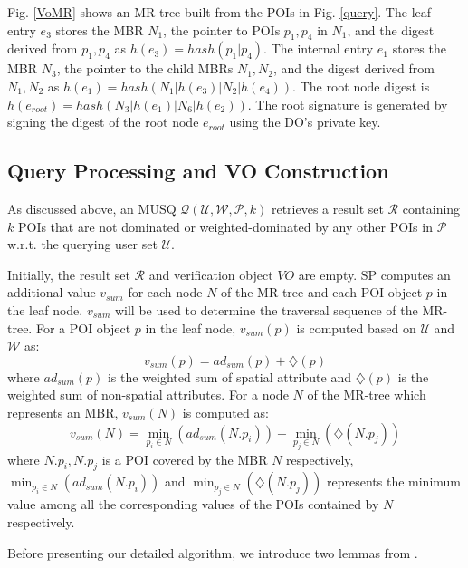 \documentclass[10pt, conference, compsocconf]{IEEEtran}
\begin{document}
Fig. \ref{VoMR} shows an MR-tree built from the POIs in Fig. \ref{query}. The leaf entry $e_3$ stores the MBR $N_1$, the pointer to POIs $p_1, p_4$ in $N_1$, and the digest derived from $p_1, p_4$ as $h(e_3) = hash(p_1|p_4)$. The internal entry $e_1$ stores the MBR $N_3$, the pointer to the child MBRs $N_1, N_2$, and the digest derived from $N_1, N_2$ as $h(e_1) = hash(N_1 | h(e_3) | N_2 | h(e_4))$. The root node digest is $h(e_{root}) = hash(N_3 | h(e_1) | N_6 | h(e_2))$. The root signature is generated by signing the digest of the root node $e_{root}$ using the DO's private key.




\subsection{Query Processing and VO Construction}\label{processing}

As discussed above, an MUSQ $\mathcal{Q}(\mathcal{U}, \mathcal{W}, \mathcal{P}, k)$ retrieves a result set $\mathcal{R}$ containing $k$ POIs that are not dominated or weighted-dominated by any other POIs in $\mathcal{P}$ w.r.t. the querying user set $\mathcal{U}$.

Initially, the result set $\mathcal{R}$ and verification object $VO$ are empty. SP computes an additional value $v_{sum}$ for each node $N$ of the MR-tree and each POI object $p$ in the leaf node. $v_{sum}$ will be used to determine the traversal sequence of the MR-tree. For a POI object $p$ in the leaf node, $v_{sum}(p)$ is computed based on $\mathcal{U}$ and $\mathcal{W}$ as:
\begin{equation*}
    v_{sum}(p) = ad_{sum}(p) + \diamondsuit(p)
\end{equation*}
where $ad_{sum}(p)$ is the weighted sum of spatial attribute and $\diamondsuit(p)$ is the weighted sum of non-spatial attributes.
For a node $N$ of the MR-tree which represents an MBR, $v_{sum}(N)$ is computed as:
\begin{equation*}
    v_{sum}(N) = \min_{p_i \in N}(ad_{sum}(N.p_i)) + \min_{p_j \in N}(\diamondsuit(N.p_j))
\end{equation*}
where $N.p_i, N.p_j$ is a POI covered by the MBR $N$ respectively, $\min_{p_i \in N}(ad_{sum}(N.p_i))$ and $\min_{p_j \in N}(\diamondsuit(N.p_j))$ represents the minimum value among all the corresponding values of the POIs contained by $N$ respectively. 

Before presenting our detailed algorithm, we introduce two lemmas from \cite{papadias2003optimal}.
\end{document}
